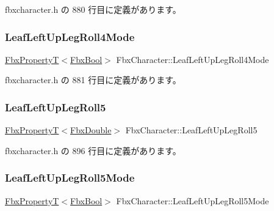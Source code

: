  fbxcharacter.\+h の 880 行目に定義があります。

\mbox{\label{class_fbx_character_aafff74f9f0579af49724f0fe0550d83f}} 
\subsubsection{\texorpdfstring{Leaf\+Left\+Up\+Leg\+Roll4\+Mode}{LeafLeftUpLegRoll4Mode}}
{\footnotesize\ttfamily \hyperlink{class_fbx_property_t}{Fbx\+PropertyT}$<$\hyperlink{fbxtypes_8h_a92e0562b2fe33e76a242f498b362262e}{Fbx\+Bool}$>$ Fbx\+Character\+::\+Leaf\+Left\+Up\+Leg\+Roll4\+Mode}



 fbxcharacter.\+h の 881 行目に定義があります。

\mbox{\label{class_fbx_character_a648cfd7497935a537ca77e015c87ab08}} 
\subsubsection{\texorpdfstring{Leaf\+Left\+Up\+Leg\+Roll5}{LeafLeftUpLegRoll5}}
{\footnotesize\ttfamily \hyperlink{class_fbx_property_t}{Fbx\+PropertyT}$<$\hyperlink{fbxtypes_8h_a171e72a1c46fc15c1a6c9c31948c1c5b}{Fbx\+Double}$>$ Fbx\+Character\+::\+Leaf\+Left\+Up\+Leg\+Roll5}



 fbxcharacter.\+h の 896 行目に定義があります。

\mbox{\label{class_fbx_character_ae7b3e26b751dd9d4f69062a4541e4e0c}} 
\subsubsection{\texorpdfstring{Leaf\+Left\+Up\+Leg\+Roll5\+Mode}{LeafLeftUpLegRoll5Mode}}
{\footnotesize\ttfamily \hyperlink{class_fbx_property_t}{Fbx\+PropertyT}$<$\hyperlink{fbxtypes_8h_a92e0562b2fe33e76a242f498b362262e}{Fbx\+Bool}$>$ Fbx\+Character\+::\+Leaf\+Left\+Up\+Leg\+Roll5\+Mode}



